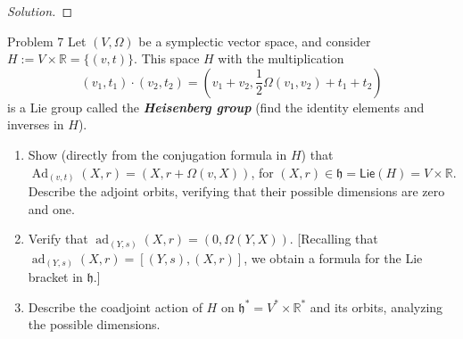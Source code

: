 \begin{proof}[Solution]

\end{proof}

\begin{thing1}{Problem 7}\leavevmode
	Let $(V,\Omega)$ be a symplectic vector space, and consider $H:=V\times \mathbb{R}=\{(v,t)\}$. This space $H$ with the multiplication
	\[(v_1,t_1)\cdot(v_2,t_2)=\left( v_1+v_2,\frac{1}{2}\Omega(v_1,v_2)+t_1+t_2 \right) \]
	is a Lie group called the \textit{\textbf{Heisenberg group}} (find the identity elements and inverses in  $H$).
	\begin{enumerate}[label=\alph*.]
		\item Show (directly from the conjugation formula in $H$) that $\operatorname{Ad}_{(v,t)}(X,r)=(X,r+\Omega(v,X))$, for $(X,r)\in\mathfrak{h}=\mathsf{Lie}(H) =V\times \mathbb{R}$. Describe the adjoint orbits, verifying that their possible dimensions are zero and one.
		\item Verify that $\operatorname{ad}_{(Y,s)}(X,r)=(0,\Omega(Y,X))$. [Recalling that $\operatorname{ad}_{(Y,s)}(X,r)=[(Y,s),(X,r)]$, we obtain a formula for the Lie bracket in $ \mathfrak{h}$.]
		\item Describe the coadjoint action of $H$ on $\mathfrak{h}^*=V^*\times \mathbb{R}^*$ and its orbits, analyzing the possible dimensions.
	\end{enumerate}
\end{thing1}

